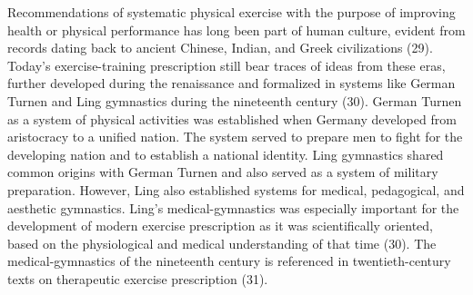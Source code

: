 \documentclass[twoside,10pt]{gihclass} %
\begin{document}
Recommendations of systematic physical exercise with the purpose of improving health or physical performance has long been part of human culture, evident from records dating back to ancient Chinese, Indian, and Greek civilizations
(29).
Today's exercise-training prescription still bear traces of ideas from these eras, further developed during the renaissance and formalized in systems like German Turnen and Ling gymnastics during the nineteenth century
(30).
German Turnen as a system of physical activities was established when Germany developed from aristocracy to a unified nation.
The system served to prepare men to fight for the developing nation and to establish a national identity.
Ling gymnastics shared common origins with German Turnen and also served as a system of military preparation.
However, Ling also established systems for medical, pedagogical, and aesthetic gymnastics.
Ling's medical-gymnastics was especially important for the development of modern exercise prescription as it was scientifically oriented, based on the physiological and medical understanding of that time (30).
The medical-gymnastics of the nineteenth century is referenced in twentieth-century texts on therapeutic exercise prescription
(31).
\end{document}
